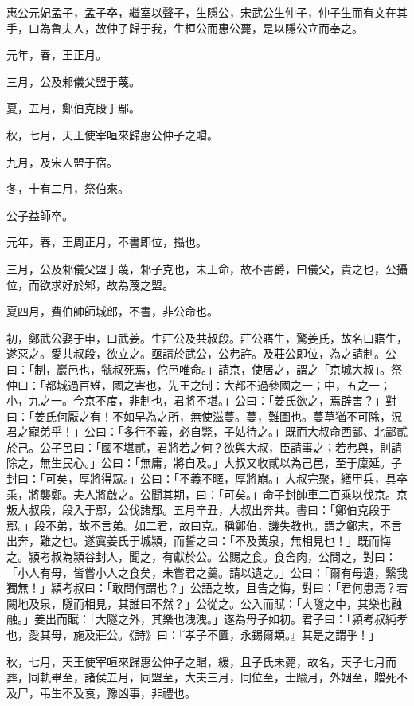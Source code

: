 
\begin{pinyinscope}
惠公元妃孟子，孟子卒，繼室以聲子，生隱公，宋武公生仲子，仲子生而有文在其手，曰為魯夫人，故仲子歸于我，生桓公而惠公薨，是以隱公立而奉之。

元年，春，王正月。

三月，公及邾儀父盟于蔑。

夏，五月，鄭伯克段于鄢。

秋，七月，天王使宰咺來歸惠公仲子之賵。

九月，及宋人盟于宿。

冬，十有二月，祭伯來。

公子益師卒。

元年，春，王周正月，不書即位，攝也。

三月，公及邾儀父盟于蔑，邾子克也，未王命，故不書爵，曰儀父，貴之也，公攝位，而欲求好於邾，故為蔑之盟。

夏四月，費伯帥師城郎，不書，非公命也。

初，鄭武公娶于申，曰武姜。生莊公及共叔段。莊公寤生，驚姜氏，故名曰寤生，遂惡之。愛共叔段，欲立之。亟請於武公，公弗許。及莊公即位，為之請制。公曰：「制，巖邑也，虢叔死焉，佗邑唯命。」請京，使居之，謂之「京城大叔」。祭仲曰：「都城過百雉，國之害也，先王之制：大都不過參國之一；中，五之一；小，九之一。今京不度，非制也，君將不堪。」公曰：「姜氏欲之，焉辟害？」對曰：「姜氏何厭之有！不如早為之所，無使滋蔓。蔓，難圖也。蔓草猶不可除，況君之寵弟乎！」公曰：「多行不義，必自斃，子姑待之。」既而大叔命西鄙、北鄙貳於己。公子呂曰：「國不堪貳，君將若之何？欲與大叔，臣請事之；若弗與，則請除之，無生民心。」公曰：「無庸，將自及。」大叔又收貳以為己邑，至于廩延。子封曰：「可矣，厚將得眾。」公曰：「不義不暱，厚將崩。」大叔完聚，繕甲兵，具卒乘，將襲鄭。夫人將啟之。公聞其期，曰：「可矣。」命子封帥車二百乘以伐京。京叛大叔段，段入于鄢，公伐諸鄢。五月辛丑，大叔出奔共。書曰：「鄭伯克段于鄢。」段不弟，故不言弟。如二君，故曰克。稱鄭伯，譏失教也。謂之鄭志，不言出奔，難之也。遂寘姜氏于城潁，而誓之曰：「不及黃泉，無相見也！」既而悔之。潁考叔為潁谷封人，聞之，有獻於公。公賜之食。食舍肉，公問之，對曰：「小人有母，皆嘗小人之食矣，未嘗君之羹。請以遺之。」公曰：「爾有母遺，繄我獨無！」潁考叔曰：「敢問何謂也？」公語之故，且告之悔，對曰：「君何患焉？若闕地及泉，隧而相見，其誰曰不然？」公從之。公入而賦：「大隧之中，其樂也融融。」姜出而賦：「大隧之外，其樂也洩洩。」遂為母子如初。君子曰：「潁考叔純孝也，愛其母，施及莊公。《詩》曰：『孝子不匱，永錫爾類。』其是之謂乎！」

秋，七月，天王使宰咺來歸惠公仲子之賵，緩，且子氏未薨，故名，天子七月而葬，同軌畢至，諸侯五月，同盟至，大夫三月，同位至，士踰月，外姻至，贈死不及尸，弔生不及哀，豫凶事，非禮也。


\end{pinyinscope}

